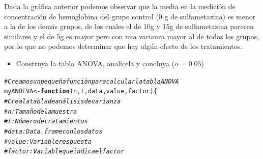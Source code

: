 \documentclass[a4paper]{scrartcl}\usepackage[]{graphicx}\usepackage[]{color}
\makeatletter
\newcommand{\hlcom}[1]{\textcolor[rgb]{0.678,0.584,0.686}{\textit{#1}}}%
\newcommand{\hlstd}[1]{\textcolor[rgb]{0.345,0.345,0.345}{#1}}%
\newcommand{\hlkwa}[1]{\textcolor[rgb]{0.161,0.373,0.58}{\textbf{#1}}}%
\newcommand{\hlkwb}[1]{\textcolor[rgb]{0.69,0.353,0.396}{#1}}%
\newcommand{\hlkwc}[1]{\textcolor[rgb]{0.333,0.667,0.333}{#1}}%
\newenvironment{kframe}{%
 \def\at@end@of@kframe{}%
 \ifinner\ifhmode%
  \def\at@end@of@kframe{\end{minipage}}%
  \begin{minipage}{\columnwidth}%
 \fi\fi%
 \def\FrameCommand##1{\hskip\@totalleftmargin \hskip-\fboxsep
 \colorbox{shadecolor}{##1}\hskip-\fboxsep
     \hskip-\linewidth \hskip-\@totalleftmargin \hskip\columnwidth}%
 \MakeFramed {\advance\hsize-\width
   \@totalleftmargin\z@ \linewidth\hsize
   \@setminipage}}%
 {\par\unskip\endMakeFramed%
 \at@end@of@kframe}
\newenvironment{knitrout}{}{} %
\makeatother
\begin{document}
\noindent Dada la gráfica anterior podemos observar que la media en la medición de concentración de hemoglobina del grupo control (0 g de sulfametazina) es menor a la de los demás grupos, de los cuales el de 10g y 15g de sulfametazina parecen similares y el de 5g es mayor pero con una varianza mayor al de todos los grupos, por lo que no podemos determinar que hay algún efecto de los tratamientos.

\begin{itemize}
  \item Construya la tabla ANOVA, analícela y concluya ($\alpha = 0.05$)
\end{itemize}
\begin{knitrout}
\color{fgcolor}\begin{kframe}
\begin{alltt}
\hlcom{# Creamos un pequeña funciòn para calcular la tabla ANOVA}
\hlstd{myANDEVA} \hlkwb{<-} \hlkwa{function}\hlstd{(}\hlkwc{n}\hlstd{,} \hlkwc{t}\hlstd{,} \hlkwc{data}\hlstd{,} \hlkwc{value}\hlstd{,} \hlkwc{factor}\hlstd{) \{}
    \hlcom{# Crea la tabla de análisis de varianza}
    \hlcom{# n: Tamaño de la muestra}
    \hlcom{# t: Número de tratamientos}
    \hlcom{# data: Data.frame con los datos}
    \hlcom{# value: Variable respuesta}
    \hlcom{# factor: Variable que indica el factor}


\end{alltt}
\end{kframe}
\end{knitrout}
\end{document}
